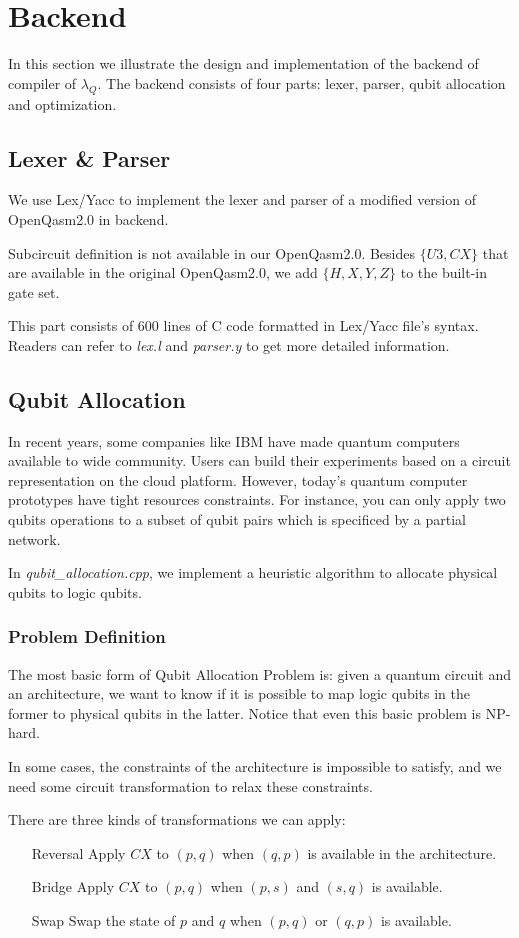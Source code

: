 \section{Backend} \label{back}
In this section we illustrate the design and implementation of the backend of compiler of $\lambda_Q$.
The backend consists of four parts: lexer, parser, qubit allocation and optimization.
\subsection{Lexer \& Parser}
We use Lex/Yacc to implement the lexer and parser of a modified version of OpenQasm2.0 in backend.

Subcircuit definition is not available in our OpenQasm2.0. Besides $\{U3,CX\}$ that are available in the original OpenQasm2.0, we add $\{H,X,Y,Z\}$ to the built-in gate set.

This part consists of 600 lines of C code formatted in Lex/Yacc file's syntax.
Readers can refer to \textit{lex.l} and \textit{parser.y} to get more detailed information.

\subsection{Qubit Allocation}
In recent years, some companies like IBM have made quantum computers available to wide community.
Users can build their experiments based on a circuit representation on the cloud platform. However, today's quantum computer prototypes have tight resources constraints.
For instance, you can only apply two qubits operations to a subset of qubit pairs which is specificed by a partial network.

In \textit{qubit\_allocation.cpp}, we implement a heuristic algorithm  to allocate physical qubits to logic qubits.

\subsubsection{Problem Definition}
The most basic form of Qubit Allocation Problem is: given a quantum circuit and an architecture, we want to know if it is possible to map logic qubits in the former to physical qubits in the latter.
Notice that even this basic problem is NP-hard.

In some cases, the constraints of the architecture is impossible to satisfy, and we need some circuit transformation to relax these constraints.

There are three kinds of transformations we can apply:
\begin{itemize}
    \item[Reversal] Apply $CX$ to $(p,q)$ when $(q,p)$ is available in the architecture.
    \item[Bridge] Apply $CX$ to $(p,q)$ when $(p,s)$ and $(s, q)$ is available.
    \item[Swap] Swap the state of $p$ and $q$ when $(p,q)$ or $(q,p)$ is available.
\end{itemize}

